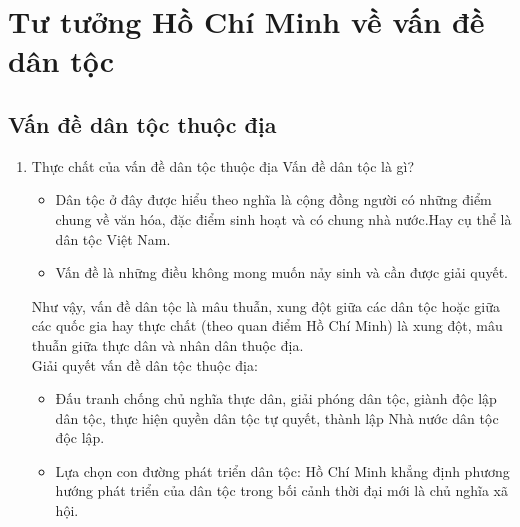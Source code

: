 \documentclass{article}
\begin{document}
	\section{Tư tưởng Hồ Chí Minh về vấn đề dân tộc}
	\subsection{Vấn đề dân tộc thuộc địa}
	\begin{enumerate}
		\item Thực chất của vấn đề dân tộc thuộc địa
		Vấn đề dân tộc là gì?
		\begin{itemize}
			\item Dân tộc ở đây được hiểu theo nghĩa là cộng đồng người có những điểm chung về văn hóa, đặc điểm sinh hoạt và có chung nhà nước.Hay cụ thể là dân tộc Việt Nam.
			\item Vấn đề là những điều không mong muốn nảy sinh và cần được giải quyết.
		\end{itemize}
		Như vậy, vấn đề dân tộc là mâu thuẫn, xung đột giữa các dân tộc hoặc giữa các quốc gia hay thực chất (theo quan điểm Hồ Chí Minh) là xung đột, mâu thuẫn giữa thực dân và nhân dân thuộc địa.\\

		Giải quyết vấn đề dân tộc thuộc địa:
		\begin{itemize}
			\item Đấu tranh chống chủ nghĩa thực dân, giải phóng dân tộc, giành độc lập dân tộc, thực hiện quyền dân tộc tự quyết, thành lập Nhà nước dân tộc độc lập.
			\item Lựa chọn con đường phát triển dân tộc: Hồ Chí Minh khẳng định phương hướng phát triển của dân tộc trong bối cảnh thời đại mới là chủ nghĩa xã hội.
		\end{itemize}


\end{enumerate}
\end{document}
